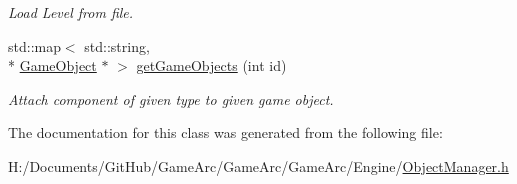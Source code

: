 \begin{DoxyCompactItemize}
\begin{DoxyCompactList}\small\item\em Load Level from file. \end{DoxyCompactList}\item 
\hypertarget{class_object_manager_ae3e3f513abd9674f2b455f161ad0fb6d}{std\+::map$<$ std\+::string, \\*
\hyperlink{class_game_object}{Game\+Object} $\ast$ $>$ \hyperlink{class_object_manager_ae3e3f513abd9674f2b455f161ad0fb6d}{get\+Game\+Objects} (int id)}\label{class_object_manager_ae3e3f513abd9674f2b455f161ad0fb6d}

\begin{DoxyCompactList}\small\item\em Attach component of given type to given game object. \end{DoxyCompactList}\end{DoxyCompactItemize}


The documentation for this class was generated from the following file\+:\begin{DoxyCompactItemize}
\item 
H\+:/\+Documents/\+Git\+Hub/\+Game\+Arc/\+Game\+Arc/\+Game\+Arc/\+Engine/\hyperlink{_object_manager_8h}{Object\+Manager.\+h}\end{DoxyCompactItemize}
